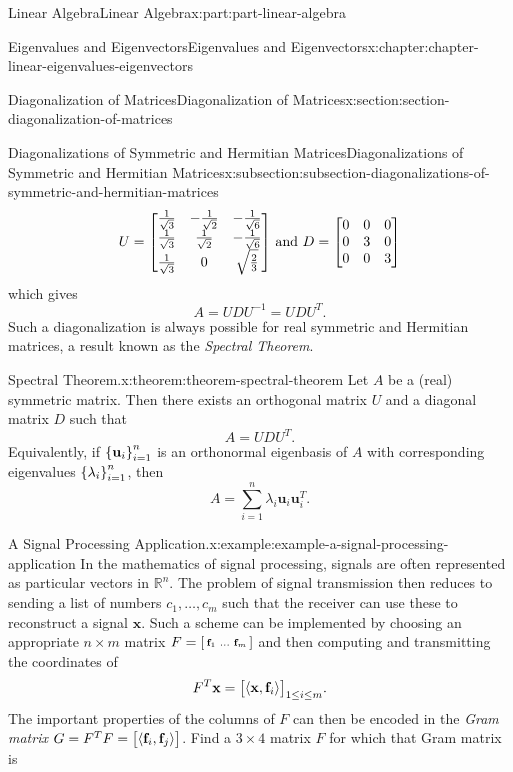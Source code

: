 \documentclass[twoside,10pt,]{book}
\numberwithin{equation}{part}
\newcommand{\RR}{\mathbb{R}}
\providecommand{\vb}[1]{\mathbf{#1}}
\newcommand{\xx}{\mathbf{x}}
\newcommand{\uu}{\mathbf{u}}
\newcommand{\dotprod}[1]{\left\langle #1 \right\rangle}
\begin{document}
\begin{partptx}{Linear Algebra}{}{Linear Algebra}{}{}{x:part:part-linear-algebra}
\begin{chapterptx}{Eigenvalues and Eigenvectors}{}{Eigenvalues and Eigenvectors}{}{}{x:chapter:chapter-linear-eigenvalues-eigenvectors}
\begin{sectionptx}{Diagonalization of Matrices}{}{Diagonalization of Matrices}{}{}{x:section:section-diagonalization-of-matrices}
\begin{subsectionptx}{Diagonalizations of Symmetric and Hermitian Matrices}{}{Diagonalizations of Symmetric and Hermitian Matrices}{}{}{x:subsection:subsection-diagonalizations-of-symmetric-and-hermitian-matrices}
\begin{equation*}
U = \mqty[\frac{1}{\sqrt{3}} & -\frac{1}{\sqrt{2}} & -\frac{1}{\sqrt{6}} \\ \frac{1}{\sqrt{3}} & \frac{1}{\sqrt{2}} & -\frac{1}{\sqrt{6}} \\ \frac{1}{\sqrt{3}} & 0 & \sqrt{\frac{2}{3}}]\text{ and }D = \mqty[0 & 0 & 0 \\ 0 & 3 & 0 \\ 0 & 0 & 3]
\end{equation*}
which gives%
\begin{equation*}
A = UDU^{-1} = UDU^T\text{.}
\end{equation*}
Such a diagonalization is always possible for real symmetric and Hermitian matrices, a result known as the \emph{Spectral Theorem}.%
\begin{theorem}{Spectral Theorem.}{}{x:theorem:theorem-spectral-theorem}%
%
Let \(A\) be a (real) symmetric matrix. Then there exists an orthogonal matrix \(U\) and a diagonal matrix \(D\) such that%
\begin{equation*}
A = UDU^T\text{.}
\end{equation*}
Equivalently, if \(\qty{\uu_i}_{i=1}^n\) is an orthonormal eigenbasis of \(A\) with corresponding eigenvalues \(\qty{\lambda_i}_{i=1}^n\), then%
\begin{equation*}
A = \sum_{i=1}^n \lambda_i \uu_i\uu_i^T\text{.}
\end{equation*}
%
\end{theorem}
\begin{example}{A Signal Processing Application.}{x:example:example-a-signal-processing-application}%
In the mathematics of signal processing, signals are often represented as particular vectors in \(\RR^n\). The problem of signal transmission then reduces to sending a list of numbers \(c_1,\ldots, c_m\) such that the receiver can use these to reconstruct a signal \(\xx\). Such a scheme can be implemented by choosing an appropriate \(n\times m\) matrix \(F = \smqty[\vb{f}_1 & \ldots & \vb{f}_m]\) and then computing and transmitting the coordinates of%
\begin{equation*}
F^T\xx = \mqty[\langle \xx,\vb{f}_i\rangle]_{1\leq i\leq m}\text{.}
\end{equation*}
The important properties of the columns of \(F\) can then be encoded in the \emph{Gram matrix} \(G = F^TF = \mqty[\dotprod{\vb{f}_i,\vb{f}_j}]\). Find a \(3\times 4\) matrix \(F\) for which that Gram matrix is%
\begin{equation*}

\end{equation*}
\end{example}
\end{subsectionptx}
\end{sectionptx}
\end{chapterptx}
\end{partptx}
\end{document}
